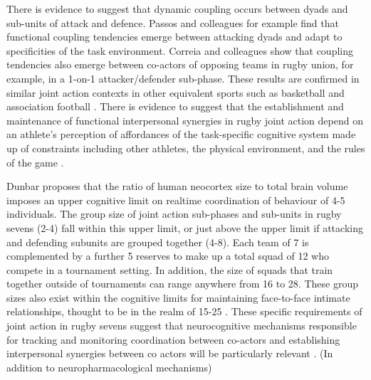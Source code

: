 There is evidence to suggest that dynamic coupling occurs between dyads and sub-units of attack and defence\citep{Passos2011,Correia2014}.  Passos and colleagues \textcite{Passos2011} for example find that functional coupling tendencies emerge between attacking dyads and adapt to specificities of the task environment.  Correia and colleagues \textcite{Correia2014} show that coupling tendencies also emerge between co-actors of opposing teams in rugby union, for example, in a 1-on-1 attacker/defender sub-phase.  These results are confirmed in similar joint action contexts in other equivalent sports such as basketball and association football \citep{Duarte2013}. There is evidence to suggest that the establishment and maintenance of functional  interpersonal synergies in rugby joint action depend on an athlete's perception of affordances of the task-specific cognitive system made up of constraints including other athletes, the physical environment, and the rules of the game \citep{Passos2012}.

Dunbar \textcite{Dunbar1992} proposes that the ratio of human neocortex size to total brain volume imposes an upper cognitive limit on realtime coordination of behaviour of  4-5 individuals.  The group size of joint action sub-phases and sub-units in rugby sevens (2-4) fall within this upper limit, or just above the upper limit if attacking and defending subunits are grouped together (4-8).  Each team of 7 is complemented by a further 5 reserves to make up a total squad of 12 who compete in a tournament setting.  In addition, the size of squads that train together outside of tournaments can range anywhere from 16 to 28.
These group sizes also exist within the cognitive limits for maintaining face-to-face intimate relationships, thought to be in the realm of 15-25 \citep{Dunbar1992,Dunbar2010}. These specific requirements of joint action in rugby sevens suggest that neurocognitive mechanisms responsible for tracking and monitoring coordination between co-actors and establishing interpersonal synergies between co actors will be particularly relevant \citep{Mogan2017}. (In addition to neuropharmacological mechanisms)

